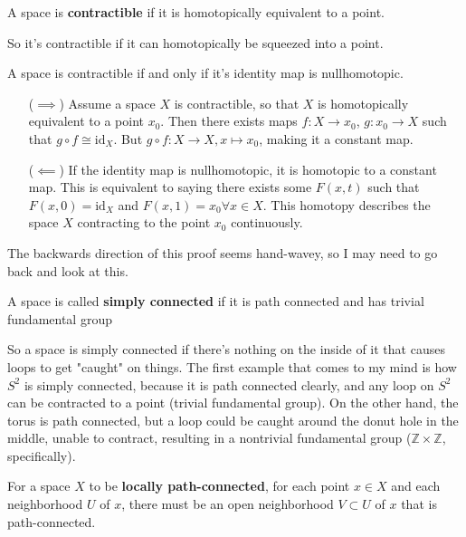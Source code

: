 \documentclass[12pt]{article}
\newcommand{\Z}{\mathbb{Z}}
\begin{document}
\begin{definition}
  A space is \textbf{contractible} if it is homotopically equivalent to a point. 
\end{definition}

So it's contractible if it can homotopically be squeezed into a point. 

\begin{theorem}{}
  A space is contractible if and only if it's identity map is nullhomotopic.
\end{theorem}
\begin{newproof}
  \begin{itemize}
    \item[($\implies$)] Assume a space $X$ is contractible, so that $X$ is homotopically equivalent to a point $x_0$. 
      Then there exists maps $f: X \to x_0$, $g:x_0 \to X$ such that $g \circ f \cong \text{id}_X$. But $g \circ f: X 
      \to X, x \mapsto x_0$, making it a constant map.
    \item[($\impliedby$)] If the identity map is nullhomotopic, it is homotopic to a constant map. This is 
      equivalent to saying there exists some $F(x,t)$ such that $F(x,0) = \text{id}_X$ and $F(x,1) = x_0 \forall x \in X$.
      This homotopy describes the space $X$ contracting to the point $x_0$ continuously.
  \end{itemize}
\end{newproof}

The backwards direction of this proof seems hand-wavey, so I may need to go back and look at this. 

\begin{definition}
  A space is called \textbf{simply connected} if it is path connected and has trivial fundamental group
\end{definition}

So a space is simply connected if there's nothing on the inside of it that causes loops to get "caught" on 
things. The first example that comes to my mind is how $S^2$ is simply connected, because it is path connected clearly, 
and any loop on $S^2$ can be contracted to a point (trivial fundamental group). On the other hand, the torus is path
connected, but a loop could be caught around the donut hole in the middle, unable to contract, resulting in a nontrivial 
fundamental group ($\Z \times \Z$, specifically).

\begin{definition}
  For a space $X$ to be \textbf{locally path-connected}, for each point $x \in X$ and each neighborhood $U$ of $x$, there must 
  be an open neighborhood $V \subset U$ of $x$ that is path-connected.
\end{definition}
\end{document}
